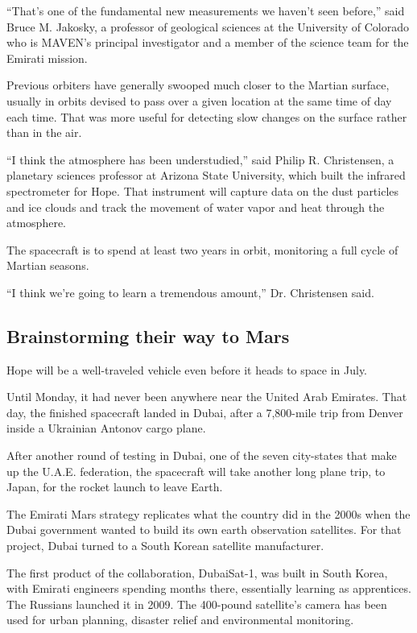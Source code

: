 ``That's one of the fundamental new measurements we haven't seen
before,'' said Bruce M. Jakosky, a professor of geological sciences at
the University of Colorado who is MAVEN's principal investigator and a
member of the science team for the Emirati mission.

Previous orbiters have generally swooped much closer to the Martian
surface, usually in orbits devised to pass over a given location at the
same time of day each time. That was more useful for detecting slow
changes on the surface rather than in the air.

``I think the atmosphere has been understudied,'' said Philip R.
Christensen, a planetary sciences professor at Arizona State University,
which built the infrared spectrometer for Hope. That instrument will
capture data on the dust particles and ice clouds and track the movement
of water vapor and heat through the atmosphere.

The spacecraft is to spend at least two years in orbit, monitoring a
full cycle of Martian seasons.

``I think we're going to learn a tremendous amount,'' Dr. Christensen
said.

\hypertarget{brainstorming-their-way-to-mars}{%
\subsection{Brainstorming their way to
Mars}\label{brainstorming-their-way-to-mars}}

Hope will be a well-traveled vehicle even before it heads to space in
July.

Until Monday, it had never been anywhere near the United Arab Emirates.
That day, the finished spacecraft landed in Dubai, after a 7,800-mile
trip from Denver inside a Ukrainian Antonov cargo plane.

After another round of testing in Dubai, one of the seven city-states
that make up the U.A.E. federation, the spacecraft will take another
long plane trip, to Japan, for the rocket launch to leave Earth.

The Emirati Mars strategy replicates what the country did in the 2000s
when the Dubai government wanted to build its own earth observation
satellites. For that project, Dubai turned to a South Korean satellite
manufacturer.

The first product of the collaboration, DubaiSat-1, was built in South
Korea, with Emirati engineers spending months there, essentially
learning as apprentices. The Russians launched it in 2009. The 400-pound
satellite's camera has been used for urban planning, disaster relief and
environmental monitoring.

